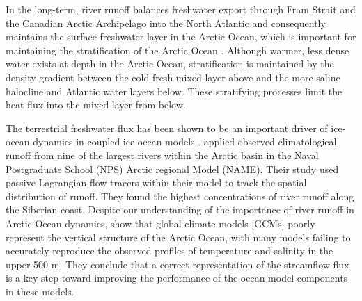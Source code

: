 \documentclass[jgrga, draft]{agutex}
\begin{document}
\begin{article}
In the long-term, river runoff balances freshwater export through Fram Strait and the Canadian Arctic Archipelago into the North Atlantic and consequently maintains the surface freshwater layer in the Arctic Ocean, which is important for maintaining the stratification of the Arctic Ocean \citep{Nummelin_2015}. %
Although warmer, less dense water exists at depth in the Arctic Ocean, stratification is maintained by the density gradient between the cold fresh mixed layer above and the more saline halocline and Atlantic water layers below.
These stratifying processes limit the heat flux into the mixed layer from below. %

The terrestrial freshwater flux has been shown to be an important driver of ice-ocean dynamics in coupled ice-ocean models \citep[e.g.][]{Morison_2012,Lique_2015}.
\citet{Newton_2008} applied observed climatological runoff from nine of the largest rivers within the Arctic basin in the Naval Postgraduate School (NPS) Arctic regional Model (NAME).
Their study used passive Lagrangian flow tracers within their model to track the spatial distribution of runoff.
They found the highest concentrations of river runoff along the Siberian coast.
Despite our understanding of the importance of river runoff in Arctic Ocean dynamics, \citet{Nummelin_2015} show that global climate models [GCMs] poorly represent the vertical structure of the Arctic Ocean, with many models failing to accurately reproduce the observed profiles of temperature and salinity in the upper 500 m.
They conclude that a correct representation of the streamflow flux is a key step toward improving the performance of the ocean model components in these models.


\end{article}
\end{document}
